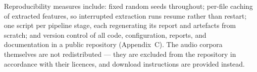 Reproducibility measures include: fixed random seeds throughout;
per-file caching of extracted features, so interrupted extraction runs
resume rather than restart; one script per pipeline stage, each
regenerating its report and artefacts from scratch; and version
control of all code, configuration, reports, and documentation in a
public repository (Appendix~C). The audio corpora themselves are not
redistributed --- they are excluded from the repository in accordance
with their licences, and download instructions are provided instead.

